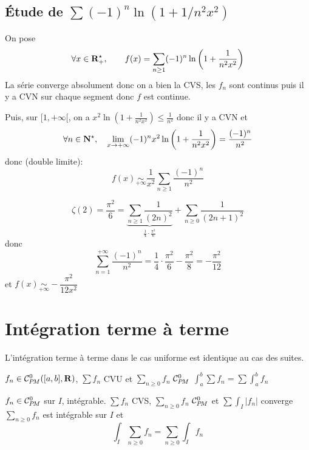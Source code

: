 \subsection{\texorpdfstring{Étude de $\sum (-1)^n\ln(1+1 / n^2x^2)$}{Second exemple}}

On pose  \[
    \forall x \in  \mathbf R_+^\star, \qquad  f(x)= \sum_{n\geq 1} (-1)^n \ln \left( 1+\frac{1}{n^2x^2} \right) 
\] 
La série converge absolument donc on a bien la CVS, les $f_n$ sont continus puis il y a CVN sur chaque segment donc  $f$ est continue.

Puis, sur $[1, +\infty[$, on a $x^2\ln(1+\frac{1}{n^2x^2})\leq \frac{1}{n^2}$ donc il y a CVN et  \[
    \forall  n \in  \mathbf N^\star, \quad  \lim_{x \to +\infty} (-1)^nx^2\ln\left( 1+\frac{1}{n^2x^2} \right) = \frac{(-1)^n}{n^2}
\] 
donc (double limite): \[
    f(x)\underset{+\infty}\sim \frac{1}{x^2}\sum_{n\geq 1}\frac{(-1)^n}{n^2}
\] 

\begin{rem}
    \[
        \zeta(2)=\frac{\pi ^2}{6}=\underbrace{\sum_{n\geq 1}\frac{1}{(2n)^2}}_{\frac{1}{4}\cdot \frac{\pi ^2}{6}}+\sum_{n\geq 0} \frac{1}{(2n+1)^2}
    \] 
    donc \[
        \sum_{n=1}^{+\infty}\frac{(-1)^n}{n^2}=\frac{1}{4}\cdot \frac{\pi ^2}{6}- \frac{\pi^2}{8}=-\frac{\pi^2}{12}
    \] 
    et $f(x)\underset{+\infty}\sim -  \dfrac{\pi ^2}{12x^2}$
\end{rem}

\section{Intégration terme à terme}

L'intégration terme à terme dans le cas uniforme est identique au cas des suites.

\begin{thm}
    \Hyp $f_n \in \CPM([a, b], \R)$, $\sum f_n$ CVU et  $\sum_{n\geq 0} f_n$  $\CPM$
    \Conc  $\displaystyle \int_a^b\sum f_n=\sum \int_a^bf_n$
\end{thm}

\begin{thm}
    \Hyp $f_n \in  \CPM$ sur $I$, intégrable. $\sum f_n$ CVS,  $\sum_{n\geq 0} f_n$ $\CPM$ et  $\sum \int_I|f_n|$ converge
    \Conc  $\sum_{n\geq 0}f_n$ est intégrable sur  $I$ et  \[
        \int_I\sum_{n\geq 0}f_n=\sum_{n\geq 0}\int_If_n
    \] 
\end{thm}


